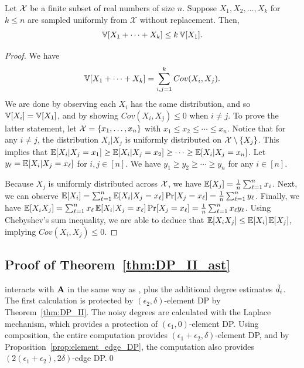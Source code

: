 \begin{lemma}\label{lem:sampling_replacement_var}
Let $\mathcal{X}$ be a finite subset of real numbers of size $n$.
Suppose $X_1, X_2, \ldots, X_k$ for $k \leq n$ are sampled
uniformly from $\mathcal{X}$ without replacement. Then,
\[
  \operatorname{\mathbb{V}}[X_1 + \cdots + X_k] \leq k \operatorname{\mathbb{V}}[X_1].
\]
\end{lemma}
\begin{proof}
  We have
  \[
    \operatorname{\mathbb{V}}[X_1 + \cdots + X_k] = \sum_{i,j=1}^k Cov(X_i, X_j).
  \]
  We are done by observing each $X_i$ has the same distribution, and so $\operatorname{\mathbb{V}}[X_i] = \operatorname{\mathbb{V}}[X_1]$, and by showing $Cov(X_i, X_j) \leq 0$ when $i \neq j$. To prove the latter statement,
  let $\mathcal{X} = \{x_1, \ldots, x_n\}$ with $x_1 \leq x_2 \leq \cdots \leq x_n$.
  Notice that for any $i \neq j$, the distribution $X_i | X_j$ is uniformly distributed
  on $\mathcal{X} \setminus \{X_j\}$. This implies that $\operatorname{\mathbb{E}}[X_i | X_j = x_1] \geq \operatorname{\mathbb{E}}[X_i | X_j = x_2]
  \geq \cdots \geq \operatorname{\mathbb{E}}[X_i | X_j = x_n]$. Let
  $y_\ell = \operatorname{\mathbb{E}}[X_i | X_j = x_\ell]$ for $i,j \in [n]$. We have
  $y_1 \geq y_2 \geq \cdots \geq y_n$ for any $i \in [n]$.

  Because $X_j$ is uniformly distributed across $\mathcal{X}$, we have $\operatorname{\mathbb{E}}[X_j] = \frac{1}{n} \sum_{\ell=1}^n x_i$.
  Next, we can observe $\operatorname{\mathbb{E}}[X_i] = \sum_{\ell=1}^n \operatorname{\mathbb{E}}[X_i | X_j = x_\ell] \allowbreak \Pr[X_j = x_\ell] = \frac{1}{n} \sum_{\ell=1}^n y_\ell$.
  Finally, we have $\operatorname{\mathbb{E}}[X_i X_j] = \sum_{\ell=1}^n x_\ell \allowbreak \operatorname{\mathbb{E}}[X_i | X_j = x_\ell] \Pr[X_j = x_\ell] = \frac{1}{n} \sum_{\ell=1}^n x_\ell y_\ell $. Using Chebyshev's sum inequality, we are able to deduce that $\operatorname{\mathbb{E}}[X_iX_j] \leq \operatorname{\mathbb{E}}[X_i]\operatorname{\mathbb{E}}[X_j]$, implying $Cov(X_i, X_j) \leq 0$.
\end{proof}

\subsection{Proof of Theorem~\ref{thm:DP_II_ast}}
\label{sub:DP_II_ast_proof}
\AlgWSTriVR{} interacts with $\mathbf{A}$ in the same way as \AlgWSTri{}, plus the additional degree estimates $\tilde{d}_i$. The first calculation is protected by
$(\epsilon_2, \delta)$-element DP by Theorem~\ref{thm:DP_II}. The noisy degrees
are calculated with the Laplace mechanism, which provides a protection of
$(\epsilon_1, 0)$-element DP. Using composition, the entire computation provides
$(\epsilon_1 + \epsilon_2, \delta)$-element DP, and by
Proposition~\ref{prop:element_edge_DP}, the computation also provides
$(2(\epsilon_1 + \epsilon_2), 2\delta)$-edge DP.\qed

